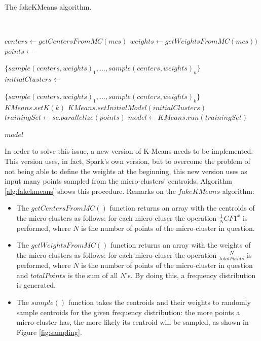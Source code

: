 \begin{algorithm}[h]
 \caption{The fakeKMeans algorithm.}\label{alg:fakekmeans}
 \begin{algorithmic}[1]
 
   \
  
   
  \vspace{10pt}
  
  \State $centers \gets getCentersFromMC(mcs)$
  \State $weights \gets getWeightsFromMC(mcs))$
  \State $points \gets $
  \item[] $\{sample(centers,weights)_1,... , sample(centers,weights)_{n}\}$
  \State $initialClusters \gets$ 
  \item[] $ \{sample(centers,weights)_1,... , sample(centers,weights)_k\}$
  \State $KMeans.setK(k)$
  \State $KMeans.setInitialModel(initialClusters)$
  \State $trainingSet \gets sc.parallelize(points)$
  \State $model \gets KMeans.run(trainingSet)$
  
  \Return $model$
 \end{algorithmic}
\end{algorithm}

In order to solve this issue, a new version of K-Means needs to be implemented. This version uses, in fact, Spark's own version, but to overcome the problem of not being able to define the weights at the beginning, this new version uses as input many points sampled from the micro-clusters' centroids. Algorithm \ref{alg:fakekmeans} shows this procedure.
Remarks on the $fakeKMeans$ algorithm:

\begin{itemize}
 \item The $getCentersFromMC()$ function returns an array with the centroids of the micro-clusters as follows: for each micro-cluser the operation $\frac{1}{N}\overline{CF1^x}$ is performed, where $N$ is the number of points of the micro-cluster in question.
 \item The $getWeightsFromMC()$ function returns an array with the weights of the micro-clusters as follows: for each micro-cluser the operation $\frac{N}{totalPoints}$ is performed, where $N$ is the number of points of the micro-cluster in question and $totalPoints$ is the sum of all $N$'s. By doing this, a frequency distribution is generated.
 \item The $sample()$ function takes the centroids and their weights to randomly sample centroids for the given frequency distribution: the more points a micro-cluster has, the more likely its centroid will be sampled, as shown in Figure \ref{fig:sampling}.
\end{itemize}

